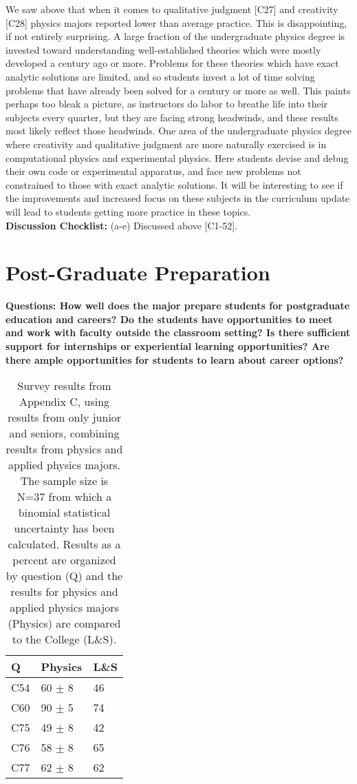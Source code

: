 \documentclass[12pt]{article}
\begin{document}
We saw above that when it comes to qualitative judgment [C27] and
creativity [C28] physics majors reported lower than average practice.
This is disappointing, if not entirely surprising.  A large fraction
of the undergraduate physics degree is invested toward understanding
well-established theories which were mostly developed a century ago or
more.  Problems for these theories which have exact analytic solutions
are limited, and so students invest a lot of time solving problems
that have already been solved for a century or more as well.  This
paints perhaps too bleak a picture, as instructors do labor to breathe
life into their subjects every quarter, but they are facing strong
headwinds, and these results most likely reflect those headwinds.  One
area of the undergraduate physics degree where creativity and
qualitative judgment are more naturally exercised is in computational
physics and experimental physics.  Here students devise and debug
their own code or experimental apparatus, and face new problems not
constrained to those with exact analytic solutions.  It will be
interesting to see if the improvements and increased focus on these
subjects in the curriculum update will lead to students getting more
practice in these topics.\\[3pt]

\noindent
{\bf Discussion Checklist:} (a-e) Discussed above [C1-52].

\newpage
\section{Post-Graduate Preparation}
{\bf Questions: How well does the major prepare students for
  postgraduate education and careers?  Do the students have
  opportunities to meet and work with faculty outside the classroom
  setting? Is there sufficient support for internships or experiential
  learning opportunities?  Are there ample opportunities for students
  to learn about career options?}

\begin{table}[htbp]
\caption{\label{tbl:appcii} Survey results from Appendix C, using
  results from only junior and seniors, combining results from physics
  and applied physics majors. The sample size is N=37 from which a
  binomial statistical uncertainty has been calculated.  Results as a
  percent are organized by question (Q) and the results for physics
  and applied physics majors (Physics) are compared to the College
  (L\&S).}
\begin{center}
\begin{tabular}{|lll|}
\hline
Q & Physics & L\&S \\
\hline
C54 & 60 $\pm$ 8 & 46 \\ 
C60 & 90 $\pm$ 5 & 74 \\
C75 & 49 $\pm$ 8 & 42 \\ 
C76 & 58 $\pm$ 8 & 65 \\ 
C77 & 62 $\pm$ 8 & 62 \\ 
\hline 
\end{tabular}
\end{center}
\end{table}
\end{document}
